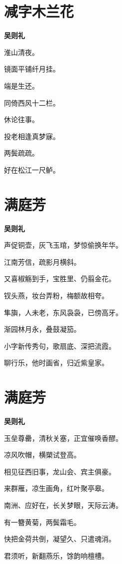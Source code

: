 \documentclass[12pt,a4paper]{ctexbook}
\begin{document}
\section{减字木兰花}
\textbf{吴则礼}\par\vspace{0.5em}
淮山清夜。\par
镜面平铺纤月挂。\par
端是生还。\par
同倚西风十二栏。\par
休论往事。\par
投老相逢真梦寐。\par
两鬓疏疏。\par
好在松江一尺鲈。\par

\section{满庭芳}
\textbf{吴则礼}\par\vspace{0.5em}
声促铜壶，灰飞玉琯，梦惊偷换年华。\par
江南芳信，疏影月横斜。\par
又喜椒觞到手，宝胜里、仍翦金花。\par
钗头燕，妆台弄粉，梅额故相夸。\par
隼旟，人未老，东风袅袅，已傍高牙。\par
渐园林月永，叠鼓凝笳。\par
小字新传秀句，歌扇底、深把流霞。\par
聊行乐，他时画省，归近紫皇家。\par

\section{满庭芳}
\textbf{吴则礼}\par\vspace{0.5em}
玉垒尊罍，清秋关塞，正宜催唤香醪。\par
凉风吹帽，横槊试登高。\par
相见征西旧事，龙山会、宾主俱豪。\par
来群雁，凉生画角，红叶聚亭皋。\par
南洲、应好在，长关梦眼，天际云涛。\par
有一簪黄菊，两鬓霜毛。\par
快把金荷共倒，凝望久、只遣魂消。\par
君须听，新翻燕乐，馀韵响檀槽。\par
\end{document}
